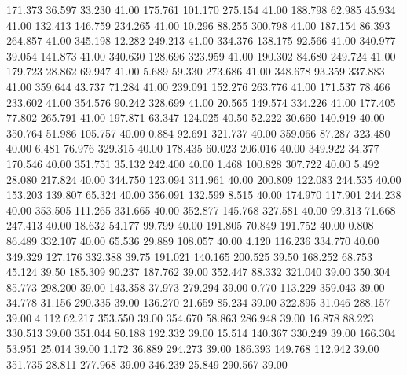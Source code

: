  171.373   36.597   33.230        41.00
 175.761  101.170  275.154        41.00
 188.798   62.985   45.934        41.00
 132.413  146.759  234.265        41.00
  10.296   88.255  300.798        41.00
 187.154   86.393  264.857        41.00
 345.198   12.282  249.213        41.00
 334.376  138.175   92.566        41.00
 340.977   39.054  141.873        41.00
 340.630  128.696  323.959        41.00
 190.302   84.680  249.724        41.00
 179.723   28.862   69.947        41.00
   5.689   59.330  273.686        41.00
 348.678   93.359  337.883        41.00
 359.644   43.737   71.284        41.00
 239.091  152.276  263.776        41.00
 171.537   78.466  233.602        41.00
 354.576   90.242  328.699        41.00
  20.565  149.574  334.226        41.00
 177.405   77.802  265.791        41.00
 197.871   63.347  124.025        40.50
  52.222   30.660  140.919        40.00
 350.764   51.986  105.757        40.00
   0.884   92.691  321.737        40.00
 359.066   87.287  323.480        40.00
   6.481   76.976  329.315        40.00
 178.435   60.023  206.016        40.00
 349.922   34.377  170.546        40.00
 351.751   35.132  242.400        40.00
   1.468  100.828  307.722        40.00
   5.492   28.080  217.824        40.00
 344.750  123.094  311.961        40.00
 200.809  122.083  244.535        40.00
 153.203  139.807   65.324        40.00
 356.091  132.599    8.515        40.00
 174.970  117.901  244.238        40.00
 353.505  111.265  331.665        40.00
 352.877  145.768  327.581        40.00
  99.313   71.668  247.413        40.00
  18.632   54.177   99.799        40.00
 191.805   70.849  191.752        40.00
   0.808   86.489  332.107        40.00
  65.536   29.889  108.057        40.00
   4.120  116.236  334.770        40.00
 349.329  127.176  332.388        39.75
 191.021  140.165  200.525        39.50
 168.252   68.753   45.124        39.50
 185.309   90.237  187.762        39.00
 352.447   88.332  321.040        39.00
 350.304   85.773  298.200        39.00
 143.358   37.973  279.294        39.00
   0.770  113.229  359.043        39.00
  34.778   31.156  290.335        39.00
 136.270   21.659   85.234        39.00
 322.895   31.046  288.157        39.00
   4.112   62.217  353.550        39.00
 354.670   58.863  286.948        39.00
  16.878   88.223  330.513        39.00
 351.044   80.188  192.332        39.00
  15.514  140.367  330.249        39.00
 166.304   53.951   25.014        39.00
   1.172   36.889  294.273        39.00
 186.393  149.768  112.942        39.00
 351.735   28.811  277.968        39.00
 346.239   25.849  290.567        39.00
